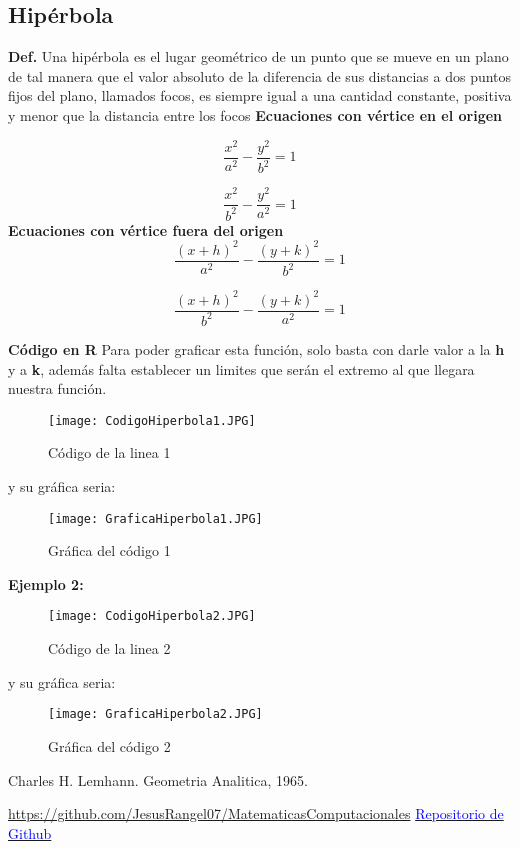 \documentclass{article}
\begin{document}
\subsection{Hipérbola}
\textbf{Def.} Una hipérbola es el lugar geométrico de un punto que se mueve en un plano de tal manera que el valor absoluto de la diferencia de sus distancias a dos puntos fijos del plano, llamados focos, es siempre igual a una cantidad constante, positiva y menor que la distancia entre los focos
\newline
\textbf{Ecuaciones con vértice en el origen}

\begin{equation}
\frac{x^2}{a^2} - \frac{y^2}{b^2} = 1
\end{equation}

\begin{equation}
\frac{x^2}{b^2} - \frac{y^2}{a^2} = 1
\end{equation}
\newline
\textbf{Ecuaciones con vértice fuera del origen}
\begin{equation}
\frac{(x+h)^2}{a^2} - \frac{(y+k)^2}{b^2} = 1
\end{equation}

\begin{equation}
\frac{(x+h)^2}{b^2} - \frac{(y+k)^2}{a^2} = 1
\end{equation}

\textbf{Código en R}
\newline Para poder graficar esta función, solo basta con darle valor a la \textbf{h} y a \textbf{k}, además falta establecer un limites que serán el extremo al que llegara nuestra función.
\newpage

\begin{figure}
\raggedright
\texttt{[image: CodigoHiperbola1.JPG]}
\caption{Código de la linea 1}
\label{fig:mesh17}
\end{figure}
y su gráfica seria:
\begin{figure}[h]
\centering
\texttt{[image: GraficaHiperbola1.JPG]}
\caption{Gráfica del código 1}
\label{fig:mesh18}
\end{figure}

\textbf{Ejemplo 2:}
\newpage

\begin{figure}
\raggedright
\texttt{[image: CodigoHiperbola2.JPG]}
\caption{Código de la linea 2}
\label{fig:mesh19}
\end{figure}
y su gráfica seria:
\begin{figure}[h]
\centering
\texttt{[image: GraficaHiperbola2.JPG]}
\caption{Gráfica del código 2}
\label{fig:mesh20}
\end{figure}

\begin{thebibliography}{0}
 Charles H. Lemhann. Geometria Analitica, 1965.

\end{thebibliography}
\textcolor{blue}{\url{https://github.com/JesusRangel07/MatematicasComputacionales}}
\href{https://github.com/edtorres2219/MatematicasComputacionales}{\textcolor{blue}{Repositorio de Github}}
\end{document}
